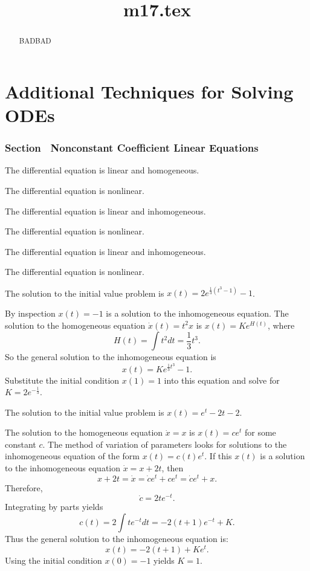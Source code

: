 \documentclass{ximera}
\title{m17.tex}
\begin{document}
\begin{abstract}
BADBAD
\end{abstract}
\maketitle

\chapter{Additional Techniques for Solving ODEs}

\subsection*{Section~\protect{\ref{sec:VarConstS}} Nonconstant Coefficient
Linear Equations}

 The differential equation is linear and homogeneous.

 The differential equation is nonlinear.

 The differential equation is linear and inhomogeneous.

 The differential equation is nonlinear.

 The differential equation is linear and inhomogeneous.

 The differential equation is nonlinear.

 \ans The solution to the initial value problem is
$x(t) = 2e^{\frac{1}{3}(t^3 - 1)} - 1$.

\soln By inspection $x(t) = -1$ is a solution to the inhomogeneous
equation.  The solution to the homogeneous equation $\dot{x}(t) = t^2x$ is
$x(t) = Ke^{H(t)}$, where
\[
H(t) = \int t^2dt = \frac{1}{3}t^3.
\]
So the general solution to the inhomogeneous equation is
\[
x(t) = Ke^{\frac{1}{3}t^3} - 1.
\]
Substitute the initial condition $x(1) = 1$ into this equation and
solve for $K = 2e^{-\frac{1}{3}}$.

\newpage
{} \ans The solution to the initial value problem is
$x(t) = e^t - 2t - 2$.

\soln The solution to the homogeneous equation $\dot{x}=x$ is $x(t)=ce^t$
for some constant $c$.  The method of variation of parameters looks for 
solutions to the inhomogeneous equation of the form $x(t)=c(t)e^t$.  If this 
$x(t)$ is a solution to the inhomogeneous equation $\dot{x}=x+2t$, then
\[
x+2t=\dot{x}=\dot{c}e^t+ce^t = \dot{c}e^t+x.
\]
Therefore,
\[
\dot{c} = 2te^{-t}.
\]
Integrating by parts yields
\[
c(t) = 2\int te^{-t}dt = -2(t+1)e^{-t} + K.
\]
Thus the general solution to the inhomogeneous equation is:
\[
x(t) = -2(t+1) + Ke^t.
\]
Using the initial condition $x(0)=-1$ yields $K=1$. 
\end{document}
